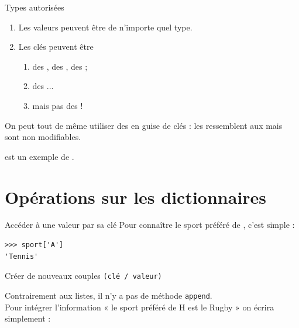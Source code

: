 \documentclass[10pt]{beamer}
\begin{document}
\begin{frame}{Types autorisées}
\\

\begin{enumerate}[--]
    \item 	Les valeurs peuvent être de n'importe quel type.\pause
    \item 	Les clés peuvent être \pause
    \begin{enumerate}[--]
        \item 	des , des , des ;\pause
        \item 	des ...\pause
        \item 	mais pas des  !
    \end{enumerate}
\end{enumerate}
On peut tout de même utiliser des  en guise de clés : \pause les  ressemblent aux  mais sont non modifiables.\\\pause

 est un exemple de .
\end{frame}
\section{Opérations sur les dictionnaires}

\begin{frame}[fragile]{Accéder à une valeur par sa clé}
Pour connaître le sport préféré de , c'est simple :\\\pause

\begin{verbatim}
>>> sport['A']
'Tennis'
\end{verbatim}
\end{frame}

\begin{frame}{Créer de nouveaux couples \texttt{(clé / valeur)}}

Contrairement aux listes, il n'y a pas de méthode \texttt{append}.\\\pause
Pour intégrer l'information « le sport préféré de H est le Rugby » on écrira simplement :\\\pause

\end{frame}
\end{document}
